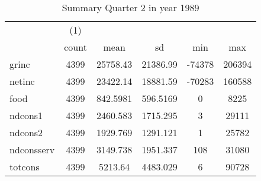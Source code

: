 \begin{table}[htbp]\centering
\def\sym#1{\ifmmode^{#1}\else\(^{#1}\)\fi}
\caption{Summary Quarter 2 in year 1989 \label{sum\_Q2\_y1989}}
\begin{tabular}{l*{1}{ccccc}}
\hline\hline
            &\multicolumn{1}{c}{(1)}&            &            &            &            \\
            &       count&        mean&          sd&         min&         max\\
\hline
grinc       &        4399&    25758.43&    21386.99&      -74378&      206394\\
netinc      &        4399&    23422.14&    18881.59&      -70283&      160588\\
food        &        4399&    842.5981&    596.5169&           0&        8225\\
ndcons1     &        4399&    2460.583&    1715.295&           3&       29111\\
ndcons2     &        4399&    1929.769&    1291.121&           1&       25782\\
ndconsserv  &        4399&    3149.738&    1951.337&         108&       31080\\
totcons     &        4399&     5213.64&    4483.029&           6&       90728\\
\hline\hline
\end{tabular}
\end{table}
